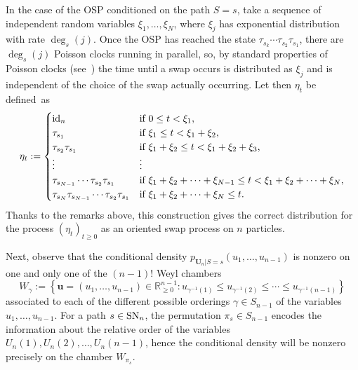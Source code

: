 \documentclass[a4paper,reqno,12pt]{amsart}
\theoremstyle{plain}
\theoremstyle{definition}
\newcommand{\sort}{\textnormal{SN}}
\newcommand{\id}{\textnormal{id}}
\newcommand{\1}{\mathbbm{1}}
\begin{document}
In the case of the OSP conditioned on the path $S=s$, take a sequence of independent random variables $\xi_1,\dots,\xi_N$, where $\xi_j$ has exponential distribution with rate $\deg_s(j)$.
Once the OSP has reached the state 
$ \tau_{s_k}\cdots \tau_{s_2}\tau_{s_1}$,
there are $\deg_s(j)$ Poisson clocks running in parallel, so, by standard properties of Poisson clocks (see~\cite[Ex.~4.1, p.~264]{romik15}) the time until a swap occurs is distributed as $\xi_j$ and is independent of the choice of the swap actually occurring.
Let then $\eta _t$ be defined~as
\[
\eta_t :=
\begin{cases}
\id_n
&\text{if $0\leq t< \xi_1$,}\\
\tau_{s_1}
&\text{if $\xi_1\leq t< \xi_1+\xi_2$,}\\
\tau_{s_2} \tau_{s_1}
&\text{if $\xi_1+\xi_2\leq t< \xi_1+\xi_2+\xi_3$,}\\
\vdots&\vdots\\
\tau_{s_{N-1}} \cdots \tau_{s_2} \tau_{s_1}
&\text{if $\xi_1+\xi_2+\cdots+\xi_{N-1}\leq t< \xi_1+\xi_2+\cdots+\xi_N$,}\\
\tau_{s_N}\tau_{s_{N-1}} \cdots \tau_{s_2} \tau_{s_1}
&\text{if $\xi_1+\xi_2+\cdots+\xi_{N}\leq t$.}
\end{cases}
\]
Thanks to the remarks above, this construction gives the correct distribution for the process $\left(\eta _t\right)_{t\geq0}$ as an oriented swap process on $n$ particles.

Next, observe that the conditional density $p_{\bm{U}_n|S=s}(u_1,\ldots,u_{n-1})$ is nonzero on one and only one of the $(n-1)!$ Weyl chambers
\begin{equation}
\label{eq:WeylChamber}
W_{\gamma} := \left\{\bm{u} = (u_1,\dots, u_{n-1}) \in\mathbb{R}^{n-1}_{\geq 0} \colon u_{\gamma^{-1}(1)}\leq u_{\gamma^{-1}(2)}\leq \cdots \leq u_{\gamma^{-1}(n-1)}\right\}
\end{equation}
associated to each of the different possible orderings $\gamma\in S_{n-1}$ of the variables $u_1,\ldots,u_{n-1}$.
For a path $s\in \sort_n$, the permutation $\pi_s\in S_{n-1}$ encodes the information about the relative order of the variables $U_n(1), U_n(2),\ldots, U_n(n-1)$, hence the conditional density will be nonzero precisely on the chamber $W_{\pi_s}$.
\end{document}
